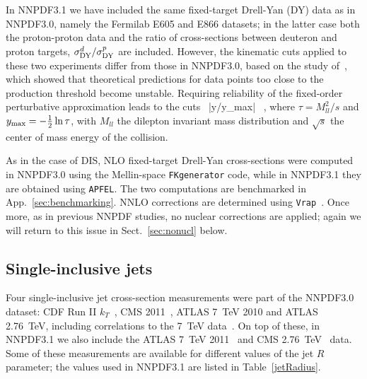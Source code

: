 In NNPDF3.1 we have included 
the same fixed-target Drell-Yan (DY) data as in NNPDF3.0,
namely the Fermilab E605 and E866 datasets; in the latter case
both the proton-proton data and the ratio of cross-sections between
deuteron and proton targets, $\sigma_{\rm DY}^d/\sigma_{\rm DY}^p$ are included.
%
However, the kinematic cuts applied to these two experiments differ
 from those in NNPDF3.0, based on 
the study
of~\cite{Bonvini:2015ira}, which showed that theoretical 
predictions for data points too close to the production threshold 
become unstable. Requiring reliability of the fixed-order
perturbative approximation leads to the cuts
\be
\tau {} \,  \quad |y/y_{\rm max}| \, ,
\ee
where 
$\tau=M_{ll}^2/s$ and $y_{\rm max}=-\frac{1}{2} \ln \tau$, with $M_{ll}$
the dilepton invariant mass distribution and $\sqrt{s}$ the center
of mass energy of the collision.


As in the case of DIS, NLO fixed-target Drell-Yan cross-sections were 
computed in NNPDF3.0 
using the Mellin-space {\tt FKgenerator} code, while in NNPDF3.1
they are obtained using {\tt APFEL}. The two computations are 
benchmarked in App.~\ref{sec:benchmarking}.
NNLO corrections are determined using {\tt Vrap}~\cite{Anastasiou:2003ds}.
%
Once more, as in previous NNPDF studies, 
no nuclear corrections are applied; again we will return to this issue
in Sect.~\ref{sec:nonucl} below.

\subsection{Single-inclusive jets}
\label{sec:datajets}

Four single-inclusive jet cross-section measurements were part of
the NNPDF3.0 dataset:
CDF Run II $k_T$~\cite{Aaltonen:2008eq}, CMS 2011~\cite{Chatrchyan:2012bja},
 ATLAS 7~TeV 2010 and ATLAS 2.76~TeV, including correlations to the 7~TeV
 data~\cite{Aad:2011fc,Aad:2013lpa}.
%
On top of these, in NNPDF3.1 we also include the 
ATLAS 7~TeV 2011~\cite{Aad:2014vwa} and CMS 2.76~TeV~\cite{Khachatryan:2015luy} data.
%
Some of these measurements are available for different values of
the jet $R$ parameter; the values used in NNPDF3.1 are listed
in Table~\ref{jetRadius}.

